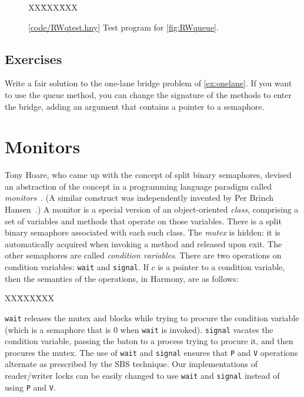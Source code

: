 \documentclass{report}
\newcommand{\harmonysource}[1]{
\begin{tabbing}
XX\=XXX\=XXX\kill
    
\end{tabbing}
}
\newcommand{\harmonylink}[1]{%
[\href{https://www.cs.cornell.edu/home/rvr/harmony/#1}{\underline{#1}}]%
}
\newenvironment{code}{
\tcolorbox
}{
\endtcolorbox
}
\begin{document}
\begin{figure}
\begin{code}
\harmonysource{RWqtest}
\end{code}
\caption{\harmonylink{code/RWqtest.hny} Test program for \autoref{fig:RWqueue}.}
\label{fig:RWqtest}
\end{figure}

\section*{Exercises}
\begin{problems}
\item Write a fair solution to the one-lane bridge problem of
\autoref{ex:onelane}.
If you want to use the queue method, you can change the signature of the
methods to enter the bridge, adding an argument that contains a pointer to a
semaphore.
\end{problems}

\chapter{Monitors}
\label{ch:monitors}

%
%

Tony Hoare, who came up with the concept of split binary semaphores, devised
an abstraction of the concept in a programming language paradigm called
\emph{monitors}~\cite{Hoare74}.
%
(A similar construct was independently invented by Per Brinch Hansen~\cite{BH73}.)
A monitor is a special version of an object-oriented \emph{class}, comprising
a set of variables and methods that operate on those variables.
There is a split binary semaphore associated with each such class.
The \textit{mutex} is hidden: it is automatically acquired when invoking a
method and released upon exit.
The other semaphores are called \emph{condition variables}.
%
There are two operations on condition variables: \texttt{wait}
%
and
\texttt{signal}.
%
If $c$ is a pointer to a condition variable, then the semantics of the
operations, in Harmony, are as follows:

\begin{code}
\harmonysource{hoaremon}
\end{code}

\texttt{wait} releases the mutex and blocks while trying
to procure the condition variable (which is a semaphore that is 0 when
\texttt{wait} is invoked).
\texttt{signal} vacates the condition variable, passing the baton to
a process trying to procure it, and then procures the mutex.
The use of \texttt{wait} and \texttt{signal} ensures that \texttt{P} and
\texttt{V} operations alternate as prescribed by the SBS technique.
Our implementations of reader/writer locks can be easily changed to
use \texttt{wait} and \texttt{signal} instead of using \texttt{P}
and \texttt{V}.
\end{document}

